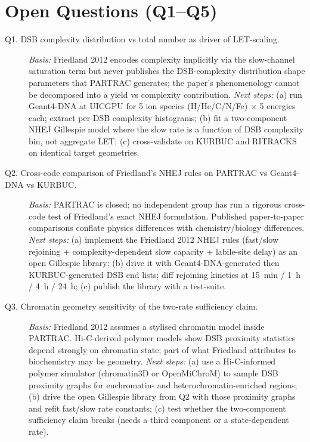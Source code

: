 \section*{Open Questions (Q1--Q5)}

\begin{description}
\item[Q1. DSB complexity distribution vs total number as driver of LET-scaling.]
\textit{Basis:} Friedland 2012 encodes complexity implicitly via the slow-channel
saturation term but never publishes the DSB-complexity distribution shape
parameters that PARTRAC generates; the paper's phenomenology cannot be
decomposed into a yield vs complexity contribution.
\textit{Next steps:} (a) run Geant4-DNA at UICGPU for 5 ion species
(H/He/C/N/Fe) $\times$ 5 energies each; extract per-DSB complexity histograms;
(b) fit a two-component NHEJ Gillespie model where the slow rate is a function
of DSB complexity bin, not aggregate LET; (c) cross-validate on KURBUC and
RITRACKS on identical target geometries.

\item[Q2. Cross-code comparison of Friedland's NHEJ rules on PARTRAC vs Geant4-DNA vs KURBUC.]
\textit{Basis:} PARTRAC is closed; no independent group has run a rigorous
cross-code test of Friedland's exact NHEJ formulation. Published paper-to-paper
comparisons conflate physics differences with chemistry/biology differences.
\textit{Next steps:} (a) implement the Friedland 2012 NHEJ rules
(fast/slow rejoining + complexity-dependent slow capacity + labile-site delay)
as an open Gillespie library; (b) drive it with Geant4-DNA-generated then
KURBUC-generated DSB end lists; diff rejoining kinetics at 15~min / 1~h / 4~h
/ 24~h; (c) publish the library with a test-suite.

\item[Q3. Chromatin geometry sensitivity of the two-rate sufficiency claim.]
\textit{Basis:} Friedland 2012 assumes a stylised chromatin model inside
PARTRAC. Hi-C-derived polymer models show DSB proximity statistics depend
strongly on chromatin state; part of what Friedland attributes to biochemistry
may be geometry.
\textit{Next steps:} (a) use a Hi-C-informed polymer simulator (chromatin3D or
OpenMiChroM) to sample DSB proximity graphs for euchromatin- and
heterochromatin-enriched regions; (b) drive the open Gillespie library from Q2
with those proximity graphs and refit fast/slow rate constants; (c) test
whether the two-component sufficiency claim breaks (needs a third component or
a state-dependent rate).


\end{description}
